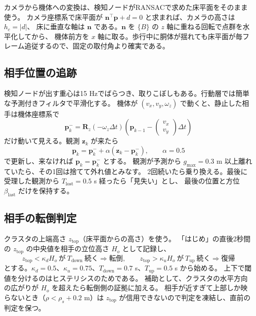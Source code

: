 \documentclass[a4paper,11pt]{ltjsarticle}
\newcommand{\vc}[1]{\bm{#1}}
\newcommand{\mat}[1]{\bm{#1}}
\begin{document}
カメラから機体への変換は、検知ノードがRANSACで求めた床平面をそのまま使う。
カメラ座標系で床平面が $\vc n^\top\vc p+d=0$ と求まれば、カメラの高さは $h_c=|d|$、
床に垂直な軸は $\vc n$ である。$\vc n$ を $\{B\}$ の $z$ 軸に重ねる回転で点群を水平化してから、
機体前方を $x$ 軸に取る。歩行中に胴体が揺れても床平面が毎フレーム追従するので、固定の取付角より確実である。

\subsection{相手位置の追跡}

検知ノードが出す重心は15 Hzでばらつき、取りこぼしもある。行動層では簡単な予測付きフィルタで平滑化する。
機体が $(v_x,v_y,\omega_z)$ で動くと、静止した相手は機体座標系で
\begin{equation}
\vc p^-_{k}=\mat R_z(-\omega_z\Delta t)\left(\vc p_{k-1}-\begin{pmatrix}v_x\\ v_y\end{pmatrix}\Delta t\right)
\label{eq:predict}
\end{equation}
だけ動いて見える。観測 $\vc z_k$ が来たら
\begin{equation}
\vc p_k=\vc p^-_k+\alpha\left(\vc z_k-\vc p^-_k\right),\qquad \alpha=0.5
\label{eq:update}
\end{equation}
で更新し、来なければ $\vc p_k=\vc p^-_k$ とする。
観測が予測から $g_{\max}=0.3$ m 以上離れていたら、その1回は捨てて外れ値とみなす。
2回続いたら乗り換える。最後に受理した観測から $T_\mathrm{lost}=0.5$ s 経ったら「見失い」とし、
最後の位置と方位 $\beta_\mathrm{last}$ だけを保持する。

\subsection{相手の転倒判定}

クラスタの上端高さ $z_\mathrm{top}$（床平面からの高さ）を使う。
「はじめ」の直後2秒間の $z_\mathrm{top}$ の中央値を相手の立位高さ $H_o$ として記録し、
\begin{equation}
z_\mathrm{top}<\kappa_d H_o\ \text{が}\ T_\mathrm{down}\ \text{続く}\Rightarrow\text{転倒},\qquad
z_\mathrm{top}>\kappa_u H_o\ \text{が}\ T_\mathrm{up}\ \text{続く}\Rightarrow\text{復帰}
\label{eq:fallen}
\end{equation}
とする。$\kappa_d=0.5$、$\kappa_u=0.75$、$T_\mathrm{down}=0.7$ s、$T_\mathrm{up}=0.5$ s から始める。
上下で閾値を分けるのはヒステリシスのためである。
補助として、クラスタの水平方向の広がりが $H_o$ を超えたら転倒側の証拠に加える。
相手が近すぎて上部しか映らないとき（$\rho<\rho_s+0.2$ m）は $z_\mathrm{top}$ が信用できないので判定を凍結し、直前の判定を保つ。
\end{document}
